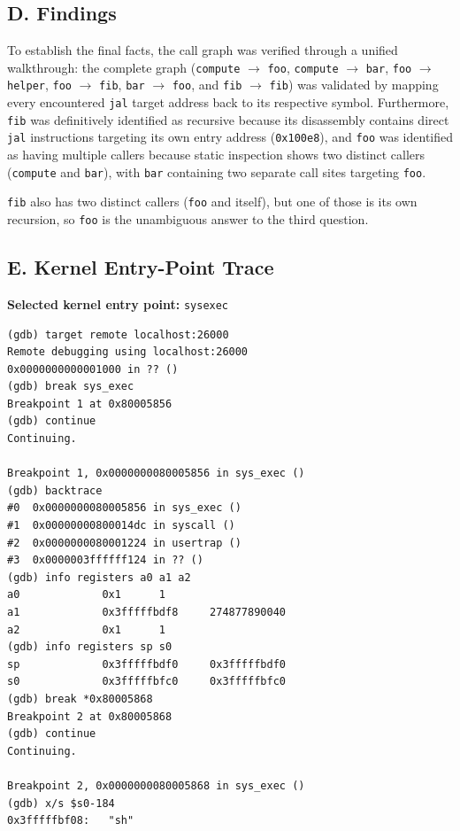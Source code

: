 \documentclass[11pt]{article}
\renewcommand{\_}{\origunderscore\allowbreak}
\begin{document}
\subsection*{D. Findings}
To establish the final facts, the call graph was verified through a unified walkthrough: the complete graph (\texttt{compute} $\rightarrow$ \texttt{foo}, \texttt{compute} $\rightarrow$ \texttt{bar}, \texttt{foo} $\rightarrow$ \texttt{helper}, \texttt{foo} $\rightarrow$ \texttt{fib}, \texttt{bar} $\rightarrow$ \texttt{foo}, and \texttt{fib} $\rightarrow$ \texttt{fib}) was validated by mapping every encountered \texttt{jal} target address back to its respective symbol. Furthermore, \texttt{fib} was definitively identified as recursive because its disassembly contains direct \texttt{jal} instructions targeting its own entry address (\texttt{0x100e8}), and \texttt{foo} was identified as having multiple callers because static inspection shows two distinct callers (\texttt{compute} and \texttt{bar}), with \texttt{bar} containing two separate call sites targeting \texttt{foo}.

\texttt{fib} also has two distinct callers (\texttt{foo} and itself), but one of those is its own recursion, so \texttt{foo} is the unambiguous answer to the third question.

\subsection*{E. Kernel Entry-Point Trace}
\textbf{Selected kernel entry point:} \texttt{sys\_exec}

\begin{lstlisting}
(gdb) target remote localhost:26000
Remote debugging using localhost:26000
0x0000000000001000 in ?? ()
(gdb) break sys_exec
Breakpoint 1 at 0x80005856
(gdb) continue
Continuing.

Breakpoint 1, 0x0000000080005856 in sys_exec ()
(gdb) backtrace
#0  0x0000000080005856 in sys_exec ()
#1  0x00000000800014dc in syscall ()
#2  0x0000000080001224 in usertrap ()
#3  0x0000003ffffff124 in ?? ()
(gdb) info registers a0 a1 a2
a0             0x1      1
a1             0x3fffffbdf8     274877890040
a2             0x1      1
(gdb) info registers sp s0
sp             0x3fffffbdf0     0x3fffffbdf0
s0             0x3fffffbfc0     0x3fffffbfc0
(gdb) break *0x80005868
Breakpoint 2 at 0x80005868
(gdb) continue
Continuing.

Breakpoint 2, 0x0000000080005868 in sys_exec ()
(gdb) x/s $s0-184
0x3fffffbf08:   "sh"
\end{lstlisting}
\end{document}
